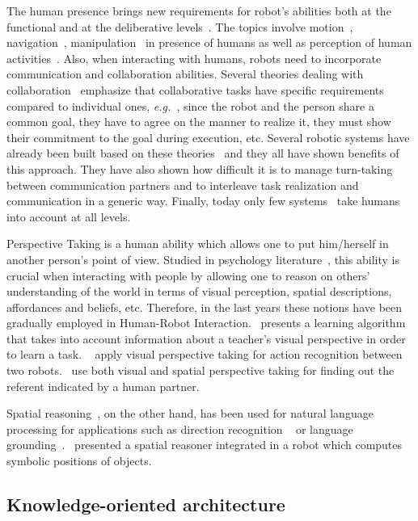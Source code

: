 \documentclass[preprint,12pt]{elsarticle}
\newcommand{\eg}{{\textit{e.g.\ }}}
\begin{document}
The human presence brings new requirements for robot's abilities both
at the functional and at the deliberative levels~\cite{Klein2004}. The
topics involve motion~\cite{Kulic2007,Berg2004,Madhav2006},
navigation~\cite{Althaus2004,Sisbot2007}, manipulation~\cite{Kemp2007}
in presence of humans as well as perception of human
activities~\cite{Breazeal2001,Burger2008}. Also, when
interacting with humans, robots need to incorporate communication and
collaboration abilities. Several theories dealing with
collaboration~\cite{Cohen1991,Grosz1996,Clark1996} emphasize that
collaborative tasks have specific requirements compared to individual
ones, \eg, since the robot and the person share a common goal, they
have to agree on the manner to realize it, they must show their
commitment to the goal during execution, etc. Several robotic systems
have already been built based on these
theories~\cite{Rich1997,Sidner2005,Tambe2005a,Breazeal2003} and they
all have shown benefits of this approach. They have also shown how
difficult it is to manage turn-taking between communication partners
and to interleave task realization and communication in a generic
way. Finally, today only few
systems~\cite{Fong_2006,Breazeal2003,Sisbot2008} take humans into
account at all levels.

Perspective Taking is a human ability which allows one to put
him/herself in another person's point of view. Studied in
psychology literature~\cite{Flavell1992,Tversky1999}, this ability is
crucial when interacting with people by allowing one to reason on
others' understanding of the world in terms of visual perception, spatial
descriptions, affordances and beliefs, etc.
Therefore, in the last years these notions have been gradually
employed in Human-Robot Interaction.~\cite{Breazeal2006} presents a
learning algorithm that takes into account information about a
teacher's visual perspective in order to learn a
task. ~\cite{Johnson2005} apply visual perspective taking for action
recognition between two robots.~\cite{Trafton2005} use both visual and
spatial perspective taking for finding out the referent indicated by a
human partner.

Spatial reasoning~\cite{O'Keefe1999}, on the other hand, has been used
for natural language processing for applications such as direction
recognition ~\cite{Kollar2010,Matuszek2010} or language
grounding~\cite{Tellex2010}.~\cite{Skubic2004} presented a spatial
reasoner integrated in a robot which computes symbolic positions of
objects.

\subsection{Knowledge-oriented architecture}
\end{document}
